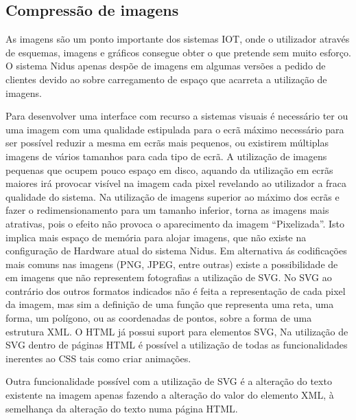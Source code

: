 \subsection{Compressão de imagens}\label{compressimaage}

\par As imagens são um ponto importante dos sistemas IOT, onde o utilizador através de esquemas, imagens e gráficos consegue obter o que pretende sem muito esforço. O sistema Nidus apenas despõe de imagens em algumas versões a pedido de clientes devido ao sobre carregamento de espaço que acarreta a utilização de imagens.
\par Para desenvolver uma interface com recurso a sistemas visuais é necessário ter ou uma imagem com uma qualidade estipulada para o ecrã máximo necessário para ser possível reduzir a mesma em ecrãs mais pequenos, ou existirem múltiplas imagens de vários tamanhos para cada tipo de ecrã. A utilização de imagens pequenas que ocupem pouco espaço em disco, aquando da utilização em ecrãs maiores irá provocar visível na imagem cada pixel revelando ao utilizador a fraca qualidade do sistema. Na utilização de imagens superior ao máximo dos ecrãs e fazer o redimensionamento para um tamanho inferior, torna as imagens mais atrativas, pois o efeito não provoca o aparecimento da imagem “Pixelizada”. Isto implica mais espaço de memória para alojar imagens, que não existe na configuração de Hardware atual do sistema Nidus. Em alternativa ás codificações mais comuns nas imagens (PNG, JPEG, entre outras) existe a possibilidade de em imagens que não representem fotografias a utilização de SVG. No SVG ao contrário dos outros formatos indicados não é feita a representação de cada pixel da imagem, mas sim a definição de uma função que representa uma reta, uma forma, um polígono, ou as coordenadas de pontos, sobre a forma de uma estrutura XML. O HTML já possui suport para elementos SVG, Na utilização de SVG dentro de páginas HTML é possível a utilização de todas as funcionalidades inerentes ao CSS tais como criar animações. 
\par Outra funcionalidade possível com a utilização de SVG é a alteração do texto existente na imagem apenas fazendo a alteração do valor do elemento XML, à semelhança da alteração do texto numa página HTML.

